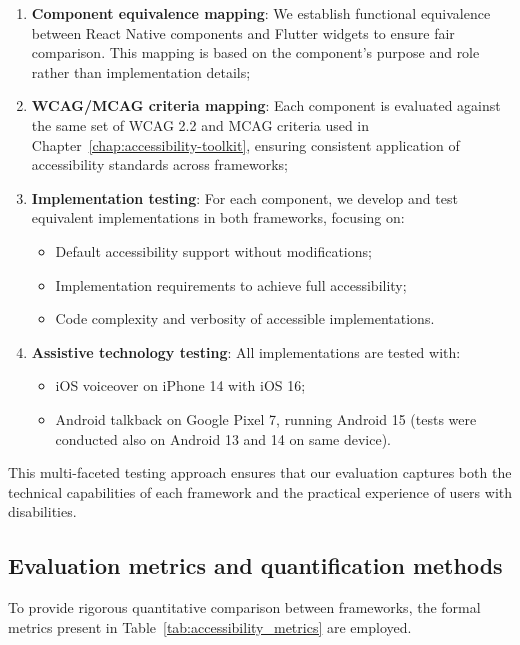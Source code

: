 \begin{enumerate}
    \item \textbf{Component equivalence mapping}: We establish functional equivalence between React Native components and Flutter widgets to ensure fair comparison. This mapping is based on the component's purpose and role rather than implementation details;
    
    \item \textbf{WCAG/MCAG criteria mapping}: Each component is evaluated against the same set of WCAG 2.2 and MCAG criteria used in Chapter~\ref{chap:accessibility-toolkit}, ensuring consistent application of accessibility standards across frameworks;
    
    \item \textbf{Implementation testing}: For each component, we develop and test equivalent implementations in both frameworks, focusing on:
    \begin{itemize}
        \item Default accessibility support without modifications;
        \item Implementation requirements to achieve full accessibility;
        \item Code complexity and verbosity of accessible implementations.
    \end{itemize}
    
    \item \textbf{Assistive technology testing}: All implementations are tested with:
    \begin{itemize}
        \item iOS \gls{voiceover} on iPhone 14 with iOS 16;
        \item Android \gls{talkback} on Google Pixel 7, running Android 15 (tests were conducted also on Android 13 and 14 on same device).
    \end{itemize}
\end{enumerate}

This multi-faceted testing approach ensures that our evaluation captures both the technical capabilities of each framework and the practical experience of users with disabilities.

\subsection{Evaluation metrics and quantification methods}

To provide rigorous quantitative comparison between frameworks, the formal metrics present in Table~\ref{tab:accessibility_metrics} are employed.

